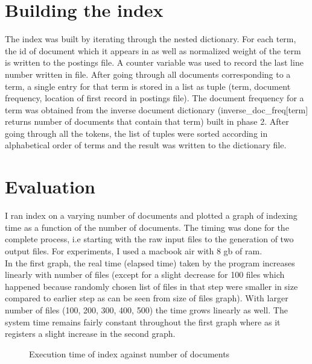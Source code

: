 \documentclass[paper=a4, fontsize=11pt]{scrartcl}
\numberwithin{equation}{section}		%
\numberwithin{figure}{section}			%
\numberwithin{table}{section}				%
\begin{document}
\section{Building the index}

The index was built by iterating through the nested dictionary. For each term, the id of document which it appears in as well as normalized weight of the term is written to the postings file. A counter variable was used to record the last line number written in file. After going through all documents corresponding to a term, a single entry for that term is stored in a list as tuple (term, document frequency, location of first record in postings file). The document frequency for a term was obtained from the inverse document dictionary (inverse\_doc\_freq[term] returns number of documents that contain that term) built in phase 2. After going through all the tokens, the list of tuples were sorted according in alphabetical order of terms and the result was written to the dictionary file.      

\section{Evaluation}

I ran index on a varying number of documents and plotted a graph of indexing time as a function of the number of documents. The timing was done for the complete process, i.e starting with the raw input files to the generation of two output files. For experiments, I used a macbook air with 8 gb of ram. \\

In the first graph, the real time (elapsed time) taken by the program increases linearly with number of files (except for a slight decrease for 100 files which happened because randomly chosen list of files in that step were smaller in size compared to earlier step as can be seen from size of files graph). With larger number of files (100, 200, 300, 400, 500) the time grows linearly  as well. The system time remains fairly constant throughout the first graph where as it registers a slight increase in the second graph.  \\


\begin{figure}[h]
\centering
{}
\caption{Execution time of index against number of documents}
\end{figure}
\end{document}
